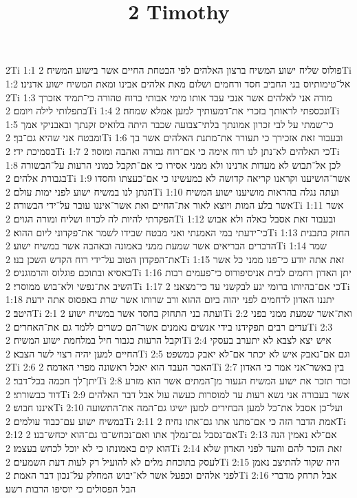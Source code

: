 

\title{2 Timothy}

2Ti 1:1  פולוס שליח ישוע המשיח ברצון האלהים לפי הבטחת החיים אשר בישוע המשיח׃
2Ti 1:2  אל־טימותיוס בני החביב חסד ורחמים ושלום מאת אלהים אבינו ומאת המשיח ישוע אדנינו׃
2Ti 1:3  מודה אני לאלהים אשר אנכי עבד אותו מימי אבותי ברוח טהורה כי־תמיד אזכרך בתפלותי לילה ויומם׃
2Ti 1:4  ונכספתי לראותך בזכרי את־דמעותיך למען אמלא שמחה׃
2Ti 1:5  כי־שמתי על לבי זכרון אמונתך בלתי־צבועה שכבר היתה בלואיס זקנתך ובאבניקי אמך ומבטח אני שהיא גם־בך׃
2Ti 1:6  ובעבור זאת אזכירך כי תעורר את־מתנת האלהים אשר בך בסמיכת ידי׃
2Ti 1:7  כי האלהים לא־נתן לנו רוח אימה כי אם־רוח גבורה ואהבה ומוסר׃
2Ti 1:8  לכן אל־תבוש לא מעדות אדנינו ולא ממני אסירו כי אם־תקבל כמוני הרעות על־הבשורה בגבורת אלהים׃
2Ti 1:9  אשר־הושיענו וקראנו קריאה קדושה לא כמעשינו כי אם־כעצתו וחסדו הנתן לנו במשיח ישוע לפני ימות עולם׃
2Ti 1:10  ועתה נגלה בהראות מושיענו ישוע המשיח אשר בלע המות ויוצא לאור את־החיים ואת אשר־איננו עובר על־ידי הבשורה׃
2Ti 1:11  אשר הפקדתי להיות לה לכרוז ושליח ומורה הגוים׃
2Ti 1:12  ובעבור זאת אסבל כאלה ולא אבוש כי־ידעתי במי האמנתי ואני מבטח שבידו לשמר את־פקדוני ליום ההוא׃
2Ti 1:13  החזק בתבנית הדברים הבריאים אשר שמעת ממני באמונה ובאהבה אשר במשיח ישוע׃
2Ti 1:14  שמר את־הפקדון הטוב על־ידי רוח הקדש השכן בנו׃
2Ti 1:15  זאת אתה יודע כי־פנו ממני כל אשר באסיא ובתוכם פוגלוס והרמוגניס׃
2Ti 1:16  יתן האדון רחמים לבית אניסיפורוס כי־פעמים רבות השיב את־נפשי ולא־בוש ממוסרי׃
2Ti 1:17  כי אם־בהיותו ברומי יגע לבקשני עד כי־מצאני׃
2Ti 1:18  יתננו האדון לרחמים לפני יהוה ביום ההוא ורב שרותו אשר שרת באפסוס אתה ידעת היטב׃
2Ti 2:1  ועתה בני התחזק בחסד אשר במשיח ישוע׃
2Ti 2:2  ואת־אשר שמעת ממני בפני עדים רבים תפקידנו בידי אנשים נאמנים אשר־הם כשרים ללמד גם את־האחרים׃
2Ti 2:3  וקבל הרעות כגבור חיל במלחמת ישוע המשיח׃
2Ti 2:4  איש יצא לצבא לא יתערב בעסקי החיים למען יהיה רצוי לשר הצבא׃
2Ti 2:5  וגם אם־נאבק איש לא יכתר אם־לא יאבק כמשפט׃
2Ti 2:6  האכר העבד הוא יאכל ראשונה מפרי האדמה׃
2Ti 2:7  בין באשר־אני אמר כי האדון יתן־לך חכמה בכל־דבר׃
2Ti 2:8  זכור תזכר את ישוע המשיח הנעור מן־המתים אשר הוא מזרע דוד כבשורתי׃
2Ti 2:9  אשר בעבורה אני נשא רעות עד למוסרות כעשה עול אבל דבר האלהים איננו חבוש׃
2Ti 2:10  ועל־כן אסבל את־כל למען הבחירים למען ישיגו גם־המה את־התשועה במשיח ישוע עם־כבוד עולמים׃
2Ti 2:11  אמת הדבר הזה כי אם־מתנו אתו גם־אתו נחיה׃
2Ti 2:12  אם־נסבל גם־נמלך אתו ואם־נכחש־בו גם־הוא יכחש־בנו׃
2Ti 2:13  אם־לא נאמין הנה הוא קים באמונתו כי לא יוכל לכחש בעצמו׃
2Ti 2:14  זאת הזכר להם והעד לפני האדון שלא לעסק בתוכחת מלים לא להועיל רק לעות דעת השמעים׃
2Ti 2:15  היה שקוד להתיצב נאמן לפני אלהים וכפעל אשר לא־יבוש המחלק על־נכון דבר האמת׃
2Ti 2:16  אבל תרחק מדברי הבל הפסולים כי יוסיפו הרבות רשע׃
